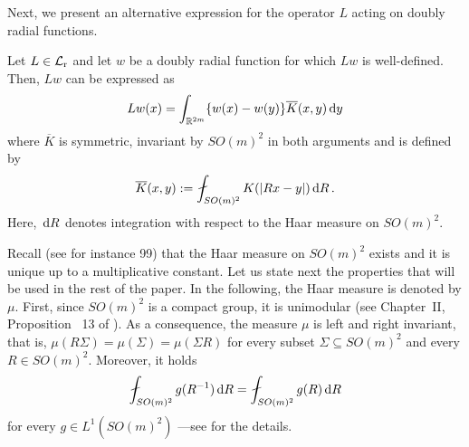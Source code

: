 Next, we present an alternative expression for the operator $L$ acting on doubly radial functions.

\begin{lemma} \label{Lemma:AlternativeOperatorExpression}
Let $L\in \mathcal{L}_{\mathrm{r}}$ and let $w$ be a doubly radial function for which $Lw$ is well-defined. Then, $Lw$ can be expressed as
$$
Lw(x) = \int_{\mathbb{R}^{2m}} \{w(x) - w(y)\} \overline{K}(x,y) \,\mathrm{d} y
$$
where $\overline{K}$ is symmetric, invariant by $SO(m)^2$ in both arguments and is defined by
\begin{equation}
\label{Eq:KbarDef}
\overline{K}(x,y) := \average_{SO(m)^2} K(|Rx - y|)\d R\,.
\end{equation}
Here, $\,\mathrm{d} R$ denotes integration with respect to the Haar measure on $SO(m)^2$.
\end{lemma}

Recall (see for instance 99) that the Haar measure on $SO(m)^2$ exists and it is unique up to a
multiplicative constant. Let us state next the properties that will be used in the rest of the
paper. In the following, the Haar measure is denoted by $\mu$. First, since $SO(m)^2$ is a compact
group, it is unimodular (see Chapter~II, Proposition~ 13 of \cite{Nachbin}). As a consequence, the
measure $\mu$ is left and right invariant, that is, $\mu(R\Sigma) = \mu(\Sigma) = \mu(\Sigma R) $
for every subset $\Sigma \subseteq SO(m)^2$ and every $R\in SO(m)^2$. Moreover, it holds
\begin{equation}
\label{Eq:Unimodular}
\average_{SO(m)^2} g(R^{-1}) \d R = \average_{SO(m)^2} g(R) \d R
\end{equation}	
for every $g\in L^1(SO(m)^2)$ ---see \cite{Nachbin} for the details.

